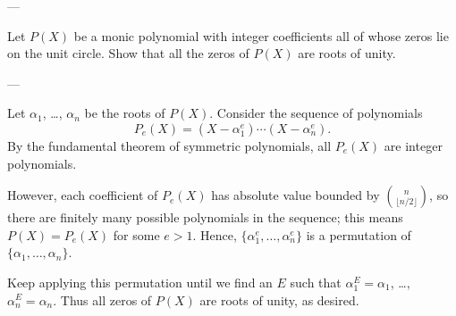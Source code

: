 
---

Let $P(X)$ be a monic polynomial with integer coefficients all of whose zeros lie on the unit circle. Show that all the zeros of $P(X)$ are roots of unity.

---

Let $\alpha_1$, \ldots, $\alpha_n$ be the roots of $P(X)$. Consider the sequence of polynomials
\[P_e(X)=(X-\alpha_1^e)\cdots(X-\alpha_n^e).\]
By the fundamental theorem of symmetric polynomials, all $P_e(X)$ are integer polynomials.

However, each coefficient of $P_e(X)$ has absolute value bounded by $\binom n{\lfloor n/2\rfloor}$, so there are finitely many possible polynomials in the sequence; this means $P(X)=P_e(X)$ for some $e>1$. Hence, $\{\alpha_1^e,\ldots,\alpha_n^e\}$ is a permutation of $\{\alpha_1,\ldots,\alpha_n\}$.

Keep applying this permutation until we find an $E$ such that $\alpha_1^E=\alpha_1$, \ldots, $\alpha_n^E=\alpha_n$. Thus all zeros of $P(X)$ are roots of unity, as desired.
